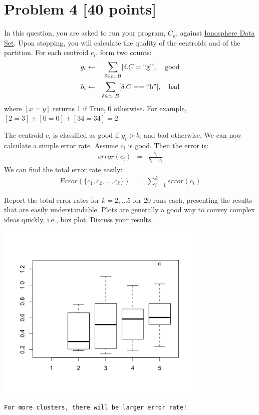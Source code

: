 \documentclass{article}
\newcommand{\quotes}[1]{``#1''}
\begin{document}
\pagebreak


 
\section*{Problem 4 [40 points]}
 
 In this question, you are asked to run  your program, $C_k$, against   \href{https://archive.ics.uci.edu/ml/datasets/ionosphere}{
Ionosphere Data Set}. Upon stopping, you will calculate the quality of the centroids and of the partition.  For each centroid $c_i$, form two counts:
  \begin{eqnarray*}
  g_i &\gets& \sum_{\delta \in c_i.B} [\delta.C =\text{\quotes{g}}],\ \ \ \mbox{\rm good}\\
  b_i &\gets& \sum_{\delta \in c_i.B} [\delta.C = =\text{\quotes{b}}], \ \ \ \mbox{\rm bad}
  \end{eqnarray*}
  where $[x = y]$ returns 1 if True, 0 otherwise.  For example, $[2 = 3] + [0 = 0] + [34 = 34] = 2$
  
  The centroid $c_i$ is classified as good if $g_i > b_i$ and bad otherwise.  We can now calculate a simple error rate.    Assume $c_i$ is good.  Then the error is:
 \begin{eqnarray*}
 error(c_i) &=& \frac{b_i}{b_i + g_i}
 \end{eqnarray*}
 We can find the total error rate easily:
 \begin{eqnarray*}
 Error(\{c_1, c_2, \ldots, c_k\}) &=& \sum_{i=1}^k error(c_i)
 \end{eqnarray*}

Report the total error rates for $k = 2,\ldots 5$ for 20 runs each, presenting the results that are easily understandable.  Plots are generally a good way to convey complex ideas quickly, i.e., box plot.  Discuss  your results.

\includegraphics[width=10cm]{4.png}
\begin{verbatim}
For more clusters, there will be larger error rate!
\end{verbatim}
\pagebreak
\end{document}

